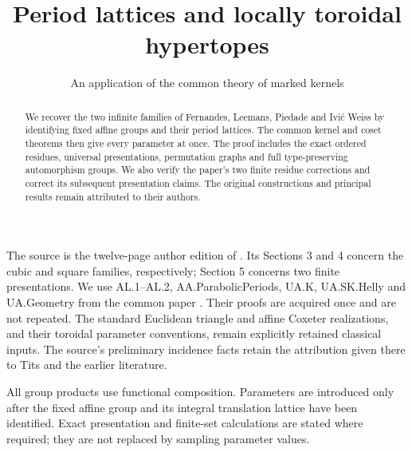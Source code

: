 \documentclass[11pt,a4paper]{article}
\title{Period lattices and locally toroidal hypertopes}
\author{An application of the common theory of marked kernels}
\date{}
\begin{document}
\maketitle
\begin{abstract}
We recover the two infinite families of Fernandes, Leemans, Piedade and
Ivi\'c Weiss by identifying fixed affine groups and their period lattices.
The common kernel and coset theorems then give every parameter at once.
The proof includes the exact ordered residues, universal presentations,
permutation graphs and full type-preserving automorphism groups.
We also verify the paper's two finite residue corrections and correct its
subsequent presentation claims. The original constructions and principal
results remain attributed to their authors.
\end{abstract}

The source is the twelve-page author edition of \cite{source}. Its
Sections 3 and 4 concern the cubic and square families, respectively;
Section 5 concerns two finite presentations. We use AL.1--AL.2,
AA.ParabolicPeriods, UA.K, UA.SK.Helly and UA.Geometry from the common
paper \cite{common}. Their proofs are acquired once and are not repeated.
The standard Euclidean triangle and affine Coxeter realizations, and
their toroidal parameter conventions, remain explicitly retained
classical inputs. The source's preliminary incidence facts retain the
attribution given there to Tits and the earlier literature.

All group products use functional composition. Parameters are introduced
only after the fixed affine group and its integral translation lattice
have been identified. Exact presentation and finite-set calculations are
stated where required; they are not replaced by sampling parameter values.






\end{document}
